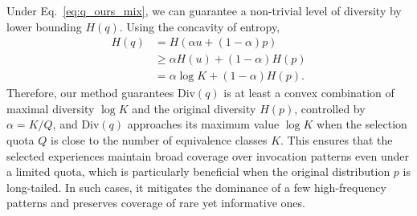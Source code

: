\documentclass[11pt]{article}
\begin{document}
Under Eq.~\eqref{eq:q_ours_mix}, we can guarantee a non-trivial level of diversity by lower bounding $H(q)$.
Using the concavity of entropy,
\begin{align}
H(q)
&= H\!\left(\alpha u + (1-\alpha)p\right) \nonumber\\
&\ge \alpha H(u) + (1-\alpha)H(p) \nonumber\\
&= \alpha \log K + (1-\alpha)H(p). \label{eq:entropy_lower}
\end{align}
Therefore, our method guarantees $\text{Div}(q)$ is at least a convex combination of maximal diversity $\log K$ and the original diversity $H(p)$, controlled by $\alpha=K/Q$, and $\text{Div}(q)$ approaches its maximum value $\log K$ when the selection quota $Q$ is close to the number of equivalence classes $K$. This ensures that the selected experiences maintain broad coverage over invocation patterns even under a limited quota, which is particularly beneficial when the original distribution $p$ is long-tailed. In such cases, it mitigates the dominance of a few high-frequency patterns and preserves coverage of rare yet informative ones.
\end{document}
